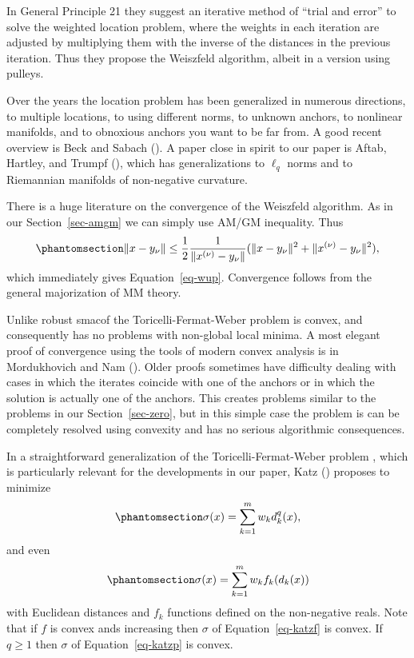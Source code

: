 \documentclass[
  12pt,
  letterpaper,
  DIV=11,
  numbers=noendperiod]{scrartcl}
\theoremstyle{definition}
\theoremstyle{plain}
\theoremstyle{plain}
\theoremstyle{plain}
\theoremstyle{definition}
\theoremstyle{remark}
\begin{document}
In General Principle 21 they suggest an iterative method of ``trial and
error'' to solve the weighted location problem, where the weights in
each iteration are adjusted by multiplying them with the inverse of the
distances in the previous iteration. Thus they propose the Weiszfeld
algorithm, albeit in a version using pulleys.

Over the years the location problem has been generalized in numerous
directions, to multiple locations, to using different norms, to unknown
anchors, to nonlinear manifolds, and to obnoxious anchors you want to be
far from. A good recent overview is Beck and Sabach
(). A paper close in spirit to our
paper is Aftab, Hartley, and Trumpf
(), which has
generalizations to \(\ell_q\) norms and to Riemannian manifolds of
non-negative curvature.

There is a huge literature on the convergence of the Weiszfeld
algorithm. As in our Section~\ref{sec-amgm} we can simply use AM/GM
inequality. Thus \begin{equation}\phantomsection\label{eq-webamgm}{
\|x-y_\nu\|\leq\frac12\frac{1}{\|x^{(\nu)}-y_\nu\|}(\|x-y_\nu\|^2+\|x^{(\nu)}-y_\nu\|^2),
}\end{equation} which immediately gives Equation~\ref{eq-wup}.
Convergence follows from the general majorization of MM theory.

Unlike robust smacof the Toricelli-Fermat-Weber problem is convex, and
consequently has no problems with non-global local minima. A most
elegant proof of convergence using the tools of modern convex analysis
is in Mordukhovich and Nam ().
Older proofs sometimes have difficulty dealing with cases in which the
iterates coincide with one of the anchors or in which the solution is
actually one of the anchors. This creates problems similar to the
problems in our Section~\ref{sec-zero}, but in this simple case the
problem is can be completely resolved using convexity and has no serious
algorithmic consequences.

In a straightforward generalization of the Toricelli-Fermat-Weber
problem , which is particularly relevant for the developments in our
paper, Katz () proposes to minimize
\begin{equation}\phantomsection\label{eq-katzp}{
\sigma(x)=\sum_{k=1}^mw_kd_k^q(x),
}\end{equation} and even
\begin{equation}\phantomsection\label{eq-katzf}{
\sigma(x)=\sum_{k=1}^mw_kf_k(d_k(x))
}\end{equation} with Euclidean distances and \(f_k\) functions defined
on the non-negative reals. Note that if \(f\) is convex ands increasing
then \(\sigma\) of Equation~\ref{eq-katzf} is convex. If \(q\geq 1\)
then \(\sigma\) of Equation~\ref{eq-katzp} is convex.
\end{document}

